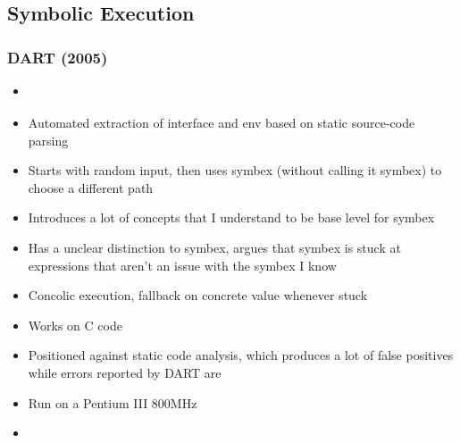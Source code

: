 \documentclass[12pt]{article}
\begin{document}
\subsection{Symbolic Execution}
\subsubsection{DART (2005)}
\begin{itemize}
    \item \cite{DART}
    \item Automated extraction of interface and env based on static source-code parsing
    \item Starts with random input, then uses symbex (without calling it symbex) to choose a different path
    \item Introduces a lot of concepts that I understand to be base level for symbex
    \item Has a unclear distinction to symbex, argues that symbex is stuck at expressions that aren't an issue with the symbex I know
    \item Concolic execution, fallback on concrete value whenever stuck
    \item Works on C code
    \item Positioned against static code analysis, which produces a lot of false positives while errors reported by DART are \cite{DART}
    \item Run on a Pentium III 800MHz
    \item {}\cite{DART}
\end{itemize}
\end{document}
